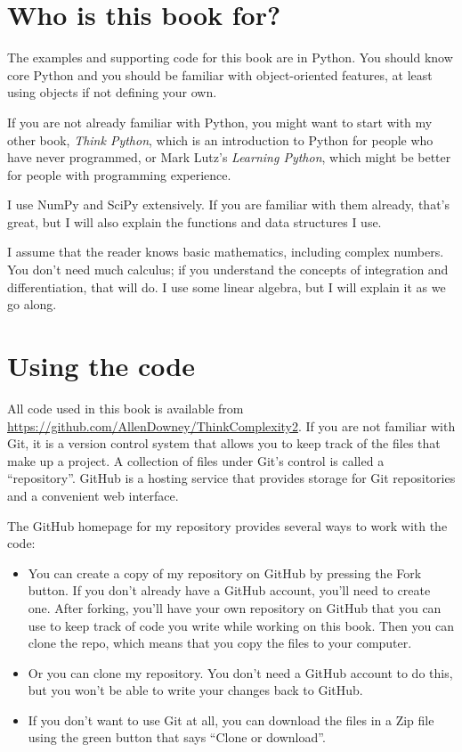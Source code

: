 \documentclass[12pt]{book}
\theoremstyle{exercise}
\begin{document}
\section{Who is this book for?}

The examples and supporting code for this book are in Python.  You
should know core Python and you should be
familiar with object-oriented features, at least using objects if not
defining your own.

If you are not already familiar with Python, you might want to start
with my other book, {\it Think Python}, which is an introduction to
Python for people who have never programmed, or Mark
Lutz's {\it Learning Python}, which might be better for people with
programming experience.

I use NumPy and SciPy extensively.  If you are familiar with them
already, that's great, but I will also explain the functions
and data structures I use.

I assume that the reader knows basic mathematics, including complex
numbers.  You don't need much calculus; if you understand the concepts
of integration and differentiation, that will do.
I use some linear algebra, but I will explain it as we
go along.


\section{Using the code}
\label{code}

All code used in this book is available from
\url{https://github.com/AllenDowney/ThinkComplexity2}.
If you are not familiar with Git, it is a
version control system that allows you to keep track of the files that
make up a project.  A collection of files under Git's control is
called a ``repository''.  GitHub is a hosting service that provides
storage for Git repositories and a convenient web interface.

  

The GitHub homepage for my repository provides several ways to
work with the code:

\begin{itemize}

\item You can create a copy of my repository
on GitHub by pressing the {\sf Fork} button.  If you don't already
have a GitHub account, you'll need to create one.  After forking, you'll
have your own repository on GitHub that you can use to keep track
of code you write while working on this book.  Then you can
clone the repo, which means that you copy the files
to your computer.


\item Or you can clone my repository.  You don't need a GitHub account
  to do this, but you won't be able to write your changes back to
  GitHub.


\item If you don't want to use Git at all, you can download the files
  in a Zip file using the green button that says ``Clone or download''.

\end{itemize}
\end{document}
